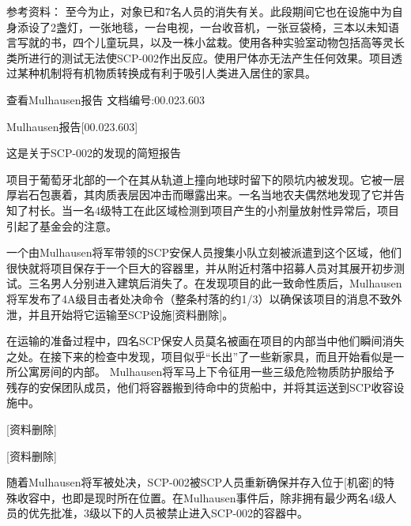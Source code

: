 参考资料： 至今为止，对象已和7名人员的消失有关。此段期间它也在设施中为自身添设了2盏灯，一张地毯，一台电视，一台收音机，一张豆袋椅，三本以未知语言写就的书，四个儿童玩具，以及一株小盆栽。使用各种实验室动物包括高等灵长类所进行的测试无法使SCP-002作出反应。使用尸体亦无法产生任何效果。项目透过某种机制将有机物质转换成有利于吸引人类进入居住的家具。

\begin{scpbox}
查看Mulhausen报告 文档编号:00.023.603
\end{scpbox}

\begin{scpbox}

Mulhausen报告[00.023.603]

这是关于SCP-002的发现的简短报告

项目于葡萄牙北部的一个在其从轨道上撞向地球时留下的陨坑内被发现。它被一层厚岩石包裹着，其肉质表层因冲击而曝露出来。一名当地农夫偶然地发现了它并告知了村长。当一名4级特工在此区域检测到项目产生的小剂量放射性异常后，项目引起了基金会的注意。

一个由Mulhausen将军带领的SCP安保人员搜集小队立刻被派遣到这个区域，他们很快就将项目保存于一个巨大的容器里，并从附近村落中招募人员对其展开初步测试。三名男人分别进入建筑后消失了。在发现项目的此一致命性质后，Mulhausen将军发布了4A级目击者处决命令（整条村落的约1/3）以确保该项目的消息不致外泄，并且开始将它运输至SCP设施[资料删除]。

在运输的准备过程中，四名SCP保安人员莫名被画在项目的内部当中他们瞬间消失之处。在接下来的检查中发现，项目似乎“长出”了一些新家具，而且开始看似是一所公寓房间的内部。 Mulhausen将军马上下令征用一些三级危险物质防护服给予残存的安保团队成员，他们将容器搬到待命中的货船中，并将其运送到SCP收容设施中。

[资料删除]

[资料删除]

随着Mulhausen将军被处决，SCP-002被SCP人员重新确保并存入位于[机密]的特殊收容中，也即是现时所在位置。在Mulhausen事件后，除非拥有最少两名4级人员的优先批准，3级以下的人员被禁止进入SCP-002的容器中。

\end{scpbox}
